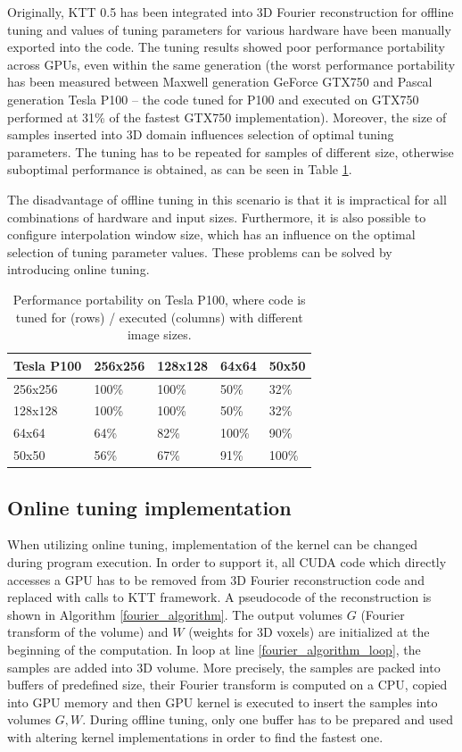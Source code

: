 \documentclass
[
    digital, %
    oneside, %
    table, %
    nolof, %
    nolot, %
    nocover %
]{fithesis3}
\begin{document}
Originally, KTT 0.5 has been integrated into 3D Fourier reconstruction for offline tuning and values of tuning parameters for various hardware have
been manually exported into the code. The tuning results showed poor performance portability across GPUs, even within the same generation (the worst
performance portability has been measured between Maxwell generation GeForce GTX750 and Pascal generation Tesla P100 -- the code tuned for P100 and
executed on GTX750 performed at 31\% of the fastest GTX750 implementation). Moreover, the size of samples inserted into 3D domain influences selection
of optimal tuning parameters. The tuning has to be repeated for samples of different size, otherwise suboptimal performance is obtained, as can be seen in
Table \ref{fourier_portability}.

The disadvantage of offline tuning in this scenario is that it is impractical for all combinations of hardware and input sizes. Furthermore, it is also
possible to configure interpolation window size, which has an influence on the optimal selection of tuning parameter values. These problems can be solved
by introducing online tuning.

\begin{table}
\begin{center}
    \begin{tabular}{|l|l|l|l|l|}
    \hline
    Tesla P100 & 256x256 & 128x128 & 64x64 & 50x50 \\
    \hline
    256x256 & 100\% & 100\% & 50\% & 32\% \\
    128x128 & 100\% & 100\% & 50\% & 32\% \\
    64x64 & 64\% & 82\% & 100\% & 90\% \\
    50x50 & 56\% & 67\% & 91\% & 100\% \\
    \hline
    \end{tabular}
\end{center}
\caption{Performance portability on Tesla P100, where code is tuned for (rows) / executed (columns) with different image sizes.}
\label{fourier_portability}
\end{table}

\subsection{Online tuning implementation}
When utilizing online tuning, implementation of the kernel can be changed during program execution. In order to support it, all CUDA code which directly
accesses a GPU has to be removed from 3D Fourier reconstruction code and replaced with calls to KTT framework. A pseudocode of the reconstruction is shown
in Algorithm \ref{fourier_algorithm}. The output volumes $G$ (Fourier transform of the volume) and $W$ (weights for 3D voxels) are initialized at the
beginning of the computation. In loop at line \ref{fourier_algorithm_loop}, the samples are added into 3D volume. More precisely, the samples are packed
into buffers of predefined size, their Fourier transform is computed on a CPU, copied into GPU memory and then GPU kernel is executed to insert the
samples into volumes $G, W$. During offline tuning, only one buffer has to be prepared and used with altering kernel implementations in order to find the
fastest one.
\end{document}
